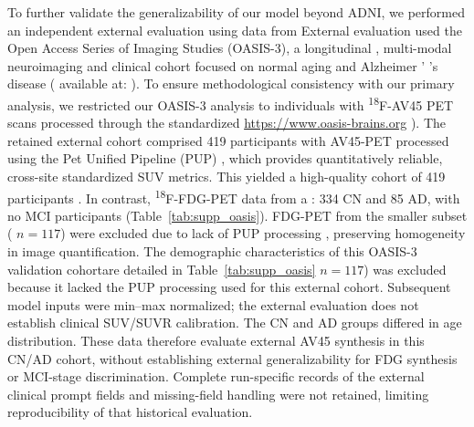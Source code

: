 \documentclass{article}
\providecommand{\DIFaddtex}[1]{{\protect\color{blue} \sf #1}} %
\providecommand{\DIFdeltex}[1]{{\protect\color{red} \scriptsize #1}} %
\providecommand{\DIFaddbegin}{} %
\providecommand{\DIFaddend}{} %
\providecommand{\DIFdelbegin}{} %
\providecommand{\DIFdelend}{} %
\providecommand{\DIFadd}[1]{\texorpdfstring{\DIFaddtex{#1}}{#1}} %
\providecommand{\DIFdel}[1]{\texorpdfstring{\DIFdeltex{#1}}{}} %
\newcommand{\DIFscaledelfig}{0.5}
\newlength{\DIFdelgraphicswidth} %
\newlength{\DIFdelgraphicsheight} %
\newcommand{\DIFaddincludegraphics}[2][]{{\color{blue}\fbox{\DIFOincludegraphics[#1]{#2}}}} %
\newcommand{\DIFdelincludegraphics}[2][]{%
\sbox{\DIFdelgraphicsbox}{\DIFOincludegraphics[#1]{#2}}%
\settoboxwidth{\DIFdelgraphicswidth}{\DIFdelgraphicsbox} %
\settoboxtotalheight{\DIFdelgraphicsheight}{\DIFdelgraphicsbox} %
\scalebox{\DIFscaledelfig}{%
\parbox[b]{\DIFdelgraphicswidth}{\usebox{\DIFdelgraphicsbox}\\[-\baselineskip] \rule{\DIFdelgraphicswidth}{0em}}\llap{\resizebox{\DIFdelgraphicswidth}{\DIFdelgraphicsheight}{%
\setlength{\unitlength}{\DIFdelgraphicswidth}%
\begin{picture}(1,1)%
\thicklines\linethickness{2pt} %
{\color[rgb]{1,0,0}\put(0,0){\framebox(1,1){}}}%
{\color[rgb]{1,0,0}\put(0,0){\line( 1,1){1}}}%
{\color[rgb]{1,0,0}\put(0,1){\line(1,-1){1}}}%
\end{picture}%
}\hspace*{3pt}}} %
} %
\DeclareRobustCommand{\DIFaddbegin}{\DIFOaddbegin \let\includegraphics\DIFaddincludegraphics} %
\DeclareRobustCommand{\DIFaddend}{\DIFOaddend \let\includegraphics\DIFOincludegraphics} %
\DeclareRobustCommand{\DIFdelbegin}{\DIFOdelbegin \let\includegraphics\DIFdelincludegraphics} %
\DeclareRobustCommand{\DIFdelend}{\DIFOaddend \let\includegraphics\DIFOincludegraphics} %
\begin{document}
\DIFdelbegin \DIFdel{To further validate the generalizability of our model beyond ADNI, we performed an independent external evaluation using data from }\DIFdelend \DIFaddbegin \DIFadd{External evaluation used }\DIFaddend the Open Access Series of Imaging Studies (OASIS-3), a longitudinal \DIFdelbegin \DIFdel{, multi-modal }\DIFdelend neuroimaging and clinical cohort focused on normal aging and Alzheimer\DIFdelbegin \DIFdel{’}\DIFdelend \DIFaddbegin \DIFadd{'}\DIFaddend s disease (\DIFdelbegin \DIFdel{available at: }%
\DIFdel{). To ensure methodological consistency with our primary analysis, we restricted our OASIS-3 analysis to individuals with \textsuperscript{18}F-AV45 PET scans processed through the standardized }\DIFdelend \DIFaddbegin \url{https://www.oasis-brains.org}\DIFadd{). The retained external cohort comprised 419 participants with AV45-PET processed using the }\DIFaddend Pet Unified Pipeline (PUP)\DIFdelbegin \DIFdel{, which provides quantitatively reliable, cross-site standardized SUV metrics. This yielded a high-quality cohort of 419 participants . In contrast, \textsuperscript{18}F-FDG-PET data from a }\DIFdelend \DIFaddbegin \DIFadd{: 334 CN and 85 AD, with no MCI participants (Table~\ref{tab:supp_oasis}). FDG-PET from the }\DIFaddend smaller subset (\DIFdelbegin \DIFdel{$n = 117$) were excluded due to lack of PUP processing , preserving homogeneity in image quantification. The demographic characteristics of this OASIS-3 validation cohortare detailed in Table~\ref{tab:supp_oasis}}\DIFdelend \DIFaddbegin \DIFadd{$n=117$) was excluded because it lacked the PUP processing used for this external cohort. Subsequent model inputs were min--max normalized; the external evaluation does not establish clinical SUV/SUVR calibration. The CN and AD groups differed in age distribution. These data therefore evaluate external AV45 synthesis in this CN/AD cohort, without establishing external generalizability for FDG synthesis or MCI-stage discrimination. Complete run-specific records of the external clinical prompt fields and missing-field handling were not retained, limiting reproducibility of that historical evaluation}\DIFaddend .
\end{document}
